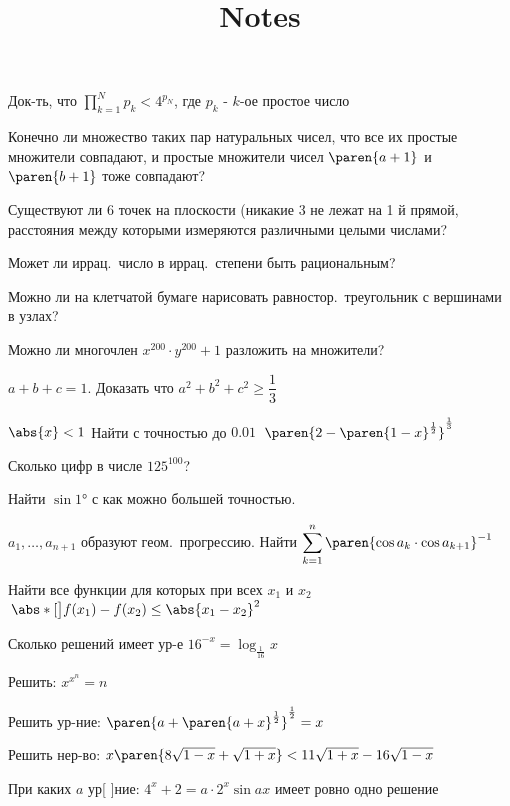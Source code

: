 \documentclass{article}
\title{Notes}
\author{}
\date{}
\begin{document}
\problem  %
Док-ть, что $\displaystyle{\prod\limits_{k = 1}^{N} {p_k} < 4^{p_N}}$, где $p_k$ - $k$-ое простое число


\problem  %
Конечно ли множество таких пар натуральных чисел,  %
что все их простые множители совпадают, и простые множители чисел $\paren{a + 1}$ и $\paren{b + 1}$ тоже совпадают?


\problem  %
Существуют ли $6$ точек на плоскости (никакие $3$ не лежат на 1 й прямой,
расстояния между которыми измеряются различными целыми числами?


\problem  %
Может ли иррац.\ число в иррац.\ степени быть рациональным?


\problem  %
Можно ли на клетчатой бумаге нарисовать равностор.\ треугольник с вершинами в узлах?


\problem  %
Можно ли многочлен $x^{200} \cdot y^{200} + 1$ разложить на множители?


\problem  %
$a + b + c = 1$.
Доказать что $a^2 + b^2 + c^2 \geq \dfrac{1}{3}$


\problem  %
$\abs{x} < 1$ Найти с точностью до $0.01 \:$ $\paren{2 - \paren{1 - x}^{\frac{1}{2}}}^{\frac{1}{3}}$


\problem  %
Сколько цифр в числе $125^{100}$?


\problem  %
Найти $\sin\ang{1}$ с как можно большей точностью.


\problem  %
$a_{1}, \dotsc, a_{n + 1}$ образуют геом.\ прогрессию.
Найти $\displaystyle{\sum\limits_{k = 1}^{n} {\paren{\cos{a_{k}} \cdot \cos{a_{k + 1}}}^{- 1}}}$


\problem  %
Найти все функции для которых при всех $x_1$ и $x_2$
$\, \abs*[\big]{f(x_1) - f(x_2)} \leq \abs{x_1 - x_2}^2$


\problem  %
Сколько решений имеет ур-е $16^{- x} = \log_{\frac{1}{16}}{x}$


\problem  %
Решить: $x^{x^n} = n$


\problem  %
Решить ур-ние: $\paren{a + \paren{a + x}^{\frac{1}{2}}}^{\frac{1}{2}} = x$


\problem  %
Решить нер-во:
$x \paren{8 \sqrt{1 - x} + \sqrt{1 + x}} < 11 \sqrt{1 + x} - 16 \sqrt{1 - x}$


\problem  %
При каких $a$ ур[ ]ние: $4^{x} + 2 = a \cdot 2^{x} \sin{a x}$ имеет ровно одно решение
\end{document}

